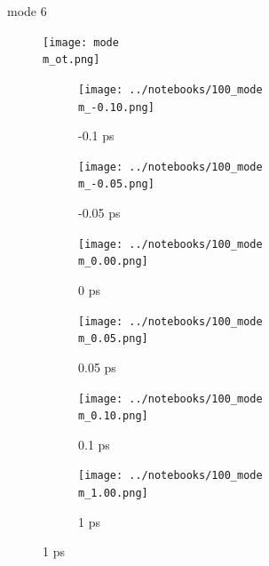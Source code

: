 \documentclass{beamer}
\newcommand\w{0.32}
\begin{document}
\renewcommand\m{6}
\begin{frame}{mode \m}
	\vspace{\vh mm}
	\begin{figure}
		\centering
		\texttt{[image: mode\\m\_ot.png]}
	\end{figure}
	\begin{figure}
		\centering
		\begin{subfigure}[b]{\w\textwidth}
			\centering
			\texttt{[image: ../notebooks/100\_mode\\m\_-0.10.png]}
			\caption{-0.1 ps}
		\end{subfigure}
		\begin{subfigure}[b]{\w\textwidth}
			\centering
			\texttt{[image: ../notebooks/100\_mode\\m\_-0.05.png]}
			\caption{-0.05 ps}
		\end{subfigure}
		\begin{subfigure}[b]{\w\textwidth}
			\centering
			\texttt{[image: ../notebooks/100\_mode\\m\_0.00.png]}
			\caption{0 ps}
		\end{subfigure}
		\begin{subfigure}[b]{\w\textwidth}
			\centering
			\texttt{[image: ../notebooks/100\_mode\\m\_0.05.png]}
			\caption{0.05 ps}
		\end{subfigure}
		\begin{subfigure}[b]{\w\textwidth}
			\centering
			\texttt{[image: ../notebooks/100\_mode\\m\_0.10.png]}
			\caption{0.1 ps}
		\end{subfigure}
		\begin{subfigure}[b]{\w\textwidth}
			\centering
			\texttt{[image: ../notebooks/100\_mode\\m\_1.00.png]}
			\caption{1 ps}
		\end{subfigure}
	\end{figure}
\end{frame}

\renewcommand\m{7}
\end{document}
